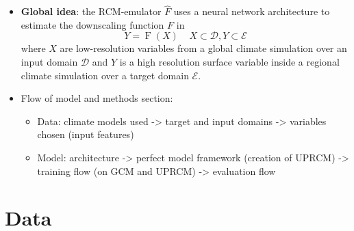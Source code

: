 \documentclass[a4paper,11pt,oneside]{report}
\begin{document}
\begin{itemize}
\item \textbf{Global idea}: the RCM-emulator $\hat{F}$ uses a neural network architecture to estimate the downscaling function $F$ in 
\begin{equation}\label{eq:emulator-equation}
    Y = \operatorname{F}(X) \;\;\;\; X\subset\mathcal{D}, Y\subset\mathcal{E}
    \end{equation}
where $X$ are low-resolution variables from a global climate simulation over an input domain $\mathcal{D}$ and $Y$ is a high resolution surface variable inside a regional climate simulation over a target domain $\mathcal{E}$. 
\item Flow of model and methods section: 
\begin{itemize}
    \item Data: climate models used -> target and input domains -> variables chosen (input features)
    \item Model: architecture -> perfect model framework (creation of UPRCM) -> training flow (on GCM and UPRCM) -> evaluation flow
\end{itemize}
\end{itemize}

\section{Data}\label{sec:data}
\end{document}
